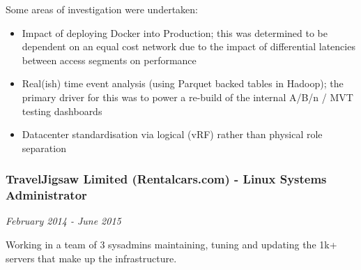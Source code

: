 Some areas of investigation were undertaken:

\begin{itemize}
\itemsep1pt\parskip0pt
\item
  Impact of deploying Docker into Production; this was determined to be
  dependent on an equal cost network due to the impact of differential
  latencies between access segments on performance
\item
  Real(ish) time event analysis (using Parquet backed tables in Hadoop);
  the primary driver for this was to power a re-build of the internal
  A/B/n / MVT testing dashboards
\item
  Datacenter standardisation via logical (vRF) rather than physical role
  separation
\end{itemize}

\subsubsection{TravelJigsaw Limited (Rentalcars.com) - Linux Systems
Administrator}\label{traveljigsaw-limited-rentalcars.com---linux-systems-administrator}

\emph{February 2014 - June 2015}

Working in a team of 3 sysadmins maintaining, tuning and updating the
1k+ servers that make up the infrastructure.

